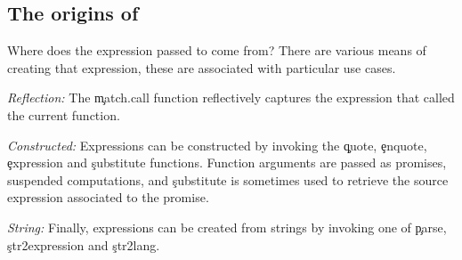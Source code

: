 \documentclass[screen,acmsmall]{acmart}
\begin{document}


\subsection{The origins of \eval}

Where does the expression passed to \eval come from? There are various means of
creating that expression, these are associated with particular use cases.

\begin{compactitem}[---]
\item {\it Reflection:} The \c{match.call} function reflectively captures
  the expression that called the current function.
\item {\it Constructed:} Expressions can be constructed by invoking the
  \c{quote}, \c{enquote}, \c{expression} and \c{substitute} functions. Function arguments are passed as promises, suspended computations, and  \c{substitute} is sometimes used to retrieve the source expression associated to the promise.
\item {\it String:} Finally, expressions can be created from strings by invoking
  one of \c{parse}, \c{str2expression} and \c{str2lang}.
\end{compactitem}
\end{document}
